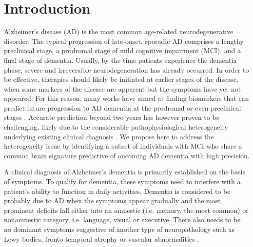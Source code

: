 \documentclass[authoryear]{elsarticle}
\begin{document}
\section{Introduction}
Alzheimer's disease (AD) is the most common age-related neurodegenerative disorder. The typical progression of late-onset, sporadic AD comprises a lengthy preclinical stage, a prodromal stage of mild cognitive impairment (MCI), and a final stage of dementia. Usually, by the time patients experience the dementia phase, severe and irreversible neurodegeneration has already occurred. In order to be effective, therapies should likely be initiated at earlier stages of the disease, when some markers of the disease are apparent but the symptoms have yet not appeared. For this reason, many works have aimed at finding biomarkers that can predict future progression to AD dementia at the prodromal or even preclinical stages \citep{Rathore2017review,Orban2017c}. Accurate prediction beyond two years has however proven to be challenging, likely due to the considerable pathophysiological heterogeneity underlying existing clinical diagnosis \citep{Rathore2017review}. We propose here to address the heterogeneity issue by identifying a subset of individuals with MCI who share a common brain signature predictive of oncoming AD dementia with high precision.

A clinical diagnosis of Alzheimer's dementia is primarily established on the basis of symptoms. To qualify for dementia, these symptoms need to interfere with a patient's ability to function in daily activities. Dementia is considered to be probably due to AD when the symptoms appear gradually and the most prominent deficits fall either into an amnestic (i.e. memory, the most common) or nonamnestic category, i.e. language, visual or executive. There also needs to be no dominant symptoms suggestive of another type of neuropathology such as Lewy bodies, fronto-temporal atrophy or vascular abnormalities \citep{Mckhann2011}.
\end{document}
